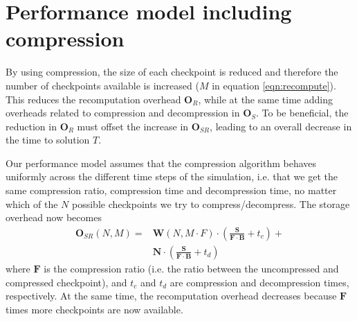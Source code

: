 \section{Performance model including compression}

By using compression, the size of each checkpoint is reduced and therefore the
number of checkpoints available is increased ($M$ in equation
\ref{eqn:recompute}). This reduces the recomputation overhead $\mathbf{O}_R$,
while at the same time adding overheads related to compression and decompression
in $\mathbf{O}_S$.
To be beneficial, the reduction in $\mathbf{O}_R$ must offset the increase in 
$\mathbf{O}_{SR}$, leading to an overall decrease in the time to solution $T$.

Our performance model assumes
 that the compression algorithm behaves uniformly
across the different time steps of the simulation, i.e. that we get the same compression ratio, compression time and 
decompression time, no matter which of the $N$ possible checkpoints we try to compress/decompress. The storage overhead
now becomes
\begin{equation}
\begin{split}
\mathbf{O}_{SR}(N, M) = &\mathbf{W}(N, M \cdot F) \cdot \left(\frac{\mathbf{S}}{\mathbf{F}
  \cdot \mathbf{B}} + t_c\right) +\\&\mathbf{N} \cdot
\left(\frac{\mathbf{S}}{\mathbf{F} \cdot \mathbf{B}} + t_d\right)
\end{split}
\end{equation}
where $\mathbf{F}$ is the compression ratio (i.e. the ratio between the uncompressed and compressed checkpoint), and $t_c$
and $t_d$ are compression and decompression times, respectively. At the same
time, the recomputation overhead decreases
because $\mathbf{F}$ times more checkpoints are now available.